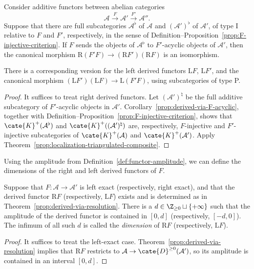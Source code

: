 \begin{theorem}\label{prop:derived-composite}
	Consider additive functors between abelian categories
	\[ \mathcal{A} \xrightarrow{F} \mathcal{A}' \xrightarrow{F'} \mathcal{A}''. \]
	Suppose that there are full subcategories $\mathcal{A}^\flat$ of
	$\mathcal{A}$ and $(\mathcal{A}')^\flat$ of $\mathcal{A}'$, of type I
	relative to $F$ and $F'$, respectively, in the sense of
	Definition--Proposition~\ref{prop:F-injective-criterion}. If $F$ sends the
	objects of $\mathcal{A}^\flat$ to $F'$-acyclic objects of $\mathcal{A}'$,
	then the canonical morphism
	$\mathrm{R}(F'F)\to(\mathrm{R}F')(\mathrm{R}F)$ is an isomorphism.

	There is a corresponding version for the left derived functors
	$\mathrm{L}F$, $\mathrm{L}F'$, and the canonical morphism
	$(\mathrm{L}F')(\mathrm{L}F)\to\mathrm{L}(F'F)$, using subcategories of
	type P.
\end{theorem}
\begin{proof}
	It suffices to treat right derived functors. Let
	$(\mathcal{A}')^\natural$ be the full additive subcategory of $F'$-acyclic
	objects in $\mathcal{A}'$. Corollary~\ref{prop:derived-via-F-acyclic},
	together with
	Definition--Proposition~\ref{prop:F-injective-criterion}, shows that
	$\cate{K}^+(\mathcal{A}^\flat)$ and
	$\cate{K}^+((\mathcal{A}')^\natural)$ are, respectively, $F$-injective and
	$F'$-injective subcategories of $\cate{K}^+(\mathcal{A})$ and
	$\cate{K}^+(\mathcal{A}')$. Apply
	Theorem~\ref{prop:localization-triangulated-composite}.
\end{proof}

Using the amplitude from Definition~\ref{def:functor-amplitude}, we can define
the dimensions of the right and left derived functors of $F$.

\begin{definition-proposition}\label{def:dim-functor}
	Suppose that $F:\mathcal{A}\to\mathcal{A}'$ is left exact (respectively,
	right exact), and that the derived functor $\mathrm{R}F$ (respectively,
	$\mathrm{L}F$) exists and is determined as in
	Theorem~\ref{prop:derived-via-resolution}. There is a
	$d\in\Z_{\geq0}\sqcup\{+\infty\}$ such that the amplitude of the derived
	functor is contained in $[0,d]$ (respectively, $[-d,0]$). The infimum of
	all such $d$ is called the \emph{dimension} of $\mathrm{R}F$
	(respectively, $\mathrm{L}F$).
\end{definition-proposition}
\begin{proof}
	It suffices to treat the left-exact case.
	Theorem~\ref{prop:derived-via-resolution} implies that $\mathrm{R}F$
	restricts to $\mathcal{A}\to\cate{D}^{\geq0}(\mathcal{A}')$, so its
	amplitude is contained in an interval $[0,d]$.
\end{proof}

